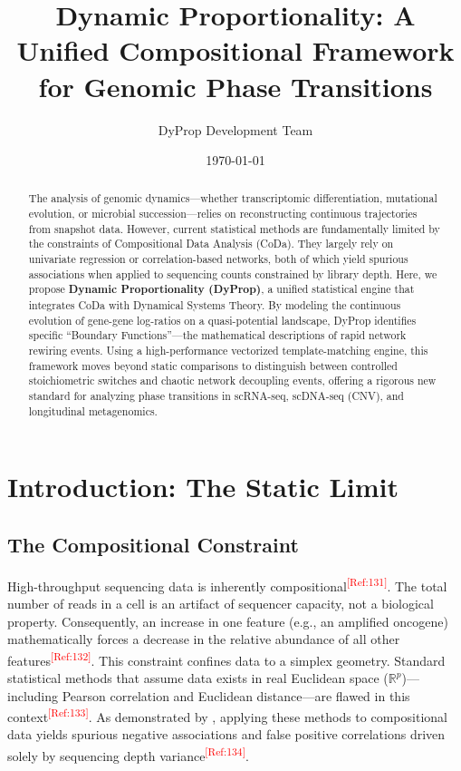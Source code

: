 \documentclass[11pt, a4paper]{article}
\title{\textbf{Dynamic Proportionality: A Unified Compositional Framework for Genomic Phase Transitions}}
\author{DyProp Development Team}
\date{\today}
\newcommand{\tref}[1]{\textsuperscript{\textcolor{red}{[Ref:#1]}}}
\begin{document}
\maketitle

\begin{abstract}
The analysis of genomic dynamics---whether transcriptomic differentiation, mutational evolution, or microbial succession---relies on reconstructing continuous trajectories from snapshot data. However, current statistical methods are fundamentally limited by the constraints of Compositional Data Analysis (CoDa). They largely rely on univariate regression or correlation-based networks, both of which yield spurious associations when applied to sequencing counts constrained by library depth. Here, we propose \textbf{Dynamic Proportionality (DyProp)}, a unified statistical engine that integrates CoDa with Dynamical Systems Theory. By modeling the continuous evolution of gene-gene log-ratios on a quasi-potential landscape, DyProp identifies specific ``Boundary Functions''---the mathematical descriptions of rapid network rewiring events. Using a high-performance vectorized template-matching engine, this framework moves beyond static comparisons to distinguish between controlled stoichiometric switches and chaotic network decoupling events, offering a rigorous new standard for analyzing phase transitions in scRNA-seq, scDNA-seq (CNV), and longitudinal metagenomics.
\end{abstract}

\section{Introduction: The Static Limit}

\subsection{The Compositional Constraint}
High-throughput sequencing data is inherently compositional\tref{131}. The total number of reads in a cell is an artifact of sequencer capacity, not a biological property. Consequently, an increase in one feature (e.g., an amplified oncogene) mathematically forces a decrease in the relative abundance of all other features\tref{132}. This constraint confines data to a simplex geometry. Standard statistical methods that assume data exists in real Euclidean space ($\mathbb{R}^p$)---including Pearson correlation and Euclidean distance---are flawed in this context\tref{133}. As demonstrated by \citet{aitchison1986}, applying these methods to compositional data yields spurious negative associations and false positive correlations driven solely by sequencing depth variance\tref{134}.
\end{document}
